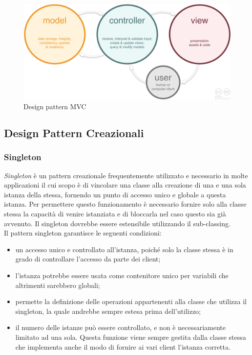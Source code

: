 \begin{figure}[H]
	\centering
	\includegraphics[width=14cm]{diagrammi_img/mvc.png}
	\caption{Design pattern MVC}
\end{figure}

\subsection{Design Pattern Creazionali}

\subsubsection{Singleton}
\textit{Singleton} è un pattern creazionale frequentemente utilizzato e necessario in molte applicazioni il cui scopo è di vincolare una classe alla creazione di una e una sola istanza della stessa, fornendo un punto di accesso unico e globale a questa istanza. Per permettere questo funzionamento è necessario fornire solo alla classe stessa la capacità di venire istanziata e di bloccarla nel caso questo sia già avvenuto. Il singleton dovrebbe essere estensibile utilizzando il sub-classing.\\
Il pattern singleton garantisce le seguenti condizioni:
\begin{itemize}
	\item un accesso unico e controllato all'istanza, poiché solo la classe stessa è in grado di controllare l'accesso da parte dei client;
	\item l'istanza potrebbe essere usata come contenitore unico per variabili che altrimenti sarebbero globali;
	\item permette la definizione delle operazioni appartenenti alla classe che utilizza il singleton, la quale andrebbe sempre estesa prima dell'utilizzo;
	\item il numero delle istanze può essere controllato, e non è necessariamente limitato ad una sola. Questa funzione viene sempre gestita dalla classe stessa che implementa anche il modo di fornire ai vari client l'istanza corretta.
\end{itemize}


